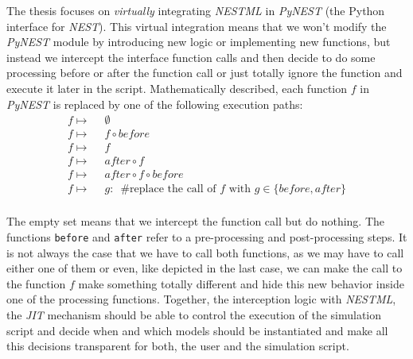 
The thesis focuses on \emph{virtually} integrating \emph{NESTML} in \emph{PyNEST} (the Python interface for \emph{NEST}). This virtual integration means that we won't modify the \emph{PyNEST} module by introducing new logic or implementing new functions, but instead we intercept the interface function calls and then decide to do some processing before or after the function call or just totally ignore the function and execute it later in the script. Mathematically described, each function $f$ in \emph{PyNEST} is replaced by one of the following execution paths:
\begin{align*}
    f \mapsto & \enspace\emptyset                                                                         \\
    f \mapsto & \enspace f \circ before                                                                   \\
    f \mapsto & \enspace f                                                                                \\
    f \mapsto & \enspace after \circ f                                                                    \\
    f \mapsto & \enspace after \circ f \circ before                                                       \\
    f \mapsto & \enspace g:\enspace \text{\#replace the call of } f \text{ with } g \in \{before, after\} \\
\end{align*}

The empty set means that we intercept the function call but do nothing. The functions \texttt{before} and \texttt{after} refer to a pre-processing and post-processing steps. It is not always the case that we have to call both functions, as we may have to call either one of them or even, like depicted in the last case, we can make the call to the function $f$ make something totally different and hide this new behavior inside one of  the processing functions. Together, the interception logic with \emph{NESTML}, the \emph{JIT} mechanism should be able to control the execution of the simulation script and decide when and which models should be instantiated and make all this decisions transparent for both, the user and the simulation script.

